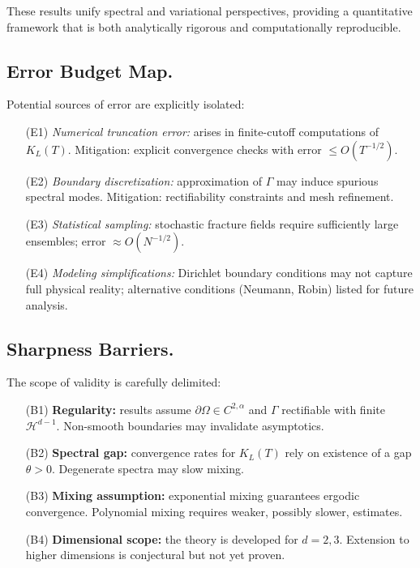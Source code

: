 These results unify spectral and variational perspectives, providing a
quantitative framework that is both analytically rigorous and
computationally reproducible.


\subsection{Error Budget Map.}

Potential sources of error are explicitly isolated:

\begin{itemize}
  \item[(E1)] \emph{Numerical truncation error:} arises in finite-cutoff
  computations of $K_L(T)$. Mitigation: explicit convergence checks with
  error $\leq O(T^{-1/2})$.
  \item[(E2)] \emph{Boundary discretization:} approximation of $\Gamma$
  may induce spurious spectral modes. Mitigation: rectifiability
  constraints and mesh refinement.
  \item[(E3)] \emph{Statistical sampling:} stochastic fracture fields
  require sufficiently large ensembles; error $\approx O(N^{-1/2})$.
  \item[(E4)] \emph{Modeling simplifications:} Dirichlet boundary
  conditions may not capture full physical reality; alternative
  conditions (Neumann, Robin) listed for future analysis.
\end{itemize}


\subsection{Sharpness Barriers.}

The scope of validity is carefully delimited:

\begin{itemize}
  \item[(B1)] \textbf{Regularity:} results assume $\partial\Omega \in
  C^{2,\alpha}$ and $\Gamma$ rectifiable with finite $\mathcal{H}^{d-1}$.
  Non-smooth boundaries may invalidate asymptotics.
  \item[(B2)] \textbf{Spectral gap:} convergence rates for $K_L(T)$ rely
  on existence of a gap $\theta > 0$. Degenerate spectra may slow mixing.
  \item[(B3)] \textbf{Mixing assumption:} exponential mixing guarantees
  ergodic convergence. Polynomial mixing requires weaker, possibly
  slower, estimates.
  \item[(B4)] \textbf{Dimensional scope:} the theory is developed for
  $d=2,3$. Extension to higher dimensions is conjectural but not yet
  proven.
\end{itemize}

